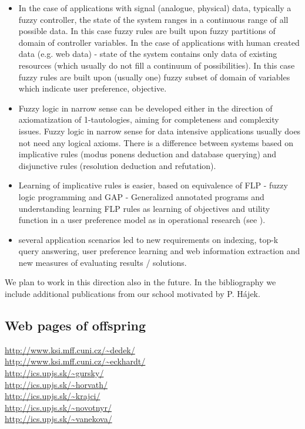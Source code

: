 \begin{itemize}
	\item In the case of applications with signal (analogue, physical) data, typically a fuzzy controller, the state of the system ranges in a continuous range of all possible data. In this case fuzzy rules are built upon fuzzy partitions of domain of controller variables. In the case of applications with human created data (e.g. web data) - state of the system contains only data of existing resources (which usually do not fill a continuum of possibilities). In this case fuzzy rules are built upon (usually one) fuzzy subset of domain of variables which indicate user preference, objective.

	\item Fuzzy logic in narrow sense can be developed either in the direction of axiomatization of 1-tautologies, aiming for completeness and complexity issues. Fuzzy logic in narrow sense for data intensive applications usually does not need any logical axioms. There is a difference between systems based on implicative rules (modus ponens deduction and database querying) and disjunctive rules (resolution deduction and refutation). 

	\item Learning of implicative rules is easier, based on equivalence of FLP - fuzzy logic programming and GAP - Generalized annotated programs  and understanding learning FLP rules as learning of objectives and utility function in a user preference model as in operational research (see \cite{47}). 

	\item several application scenarios led to new requirements on indexing, top-k query answering, user preference learning and web information extraction and new measures of evaluating results / solutions. 
\end{itemize}

     We plan to work in this direction also in the future.      
     In the bibliography we include additional publications from our school motivated by P. H\'{a}jek. 

\subsection*{Web pages of offspring}

{\small
\noindent\url{http://www.ksi.mff.cuni.cz/~dedek/}
\\\url{http://www.ksi.mff.cuni.cz/~eckhardt/}
\\\url{http://ics.upjs.sk/~gursky/} 
\\\url{http://ics.upjs.sk/~horvath/} 
\\\url{http://ics.upjs.sk/~krajci/}
\\\url{http://ics.upjs.sk/~novotnyr/}
\\\url{http://ics.upjs.sk/~vanekova/}
}



